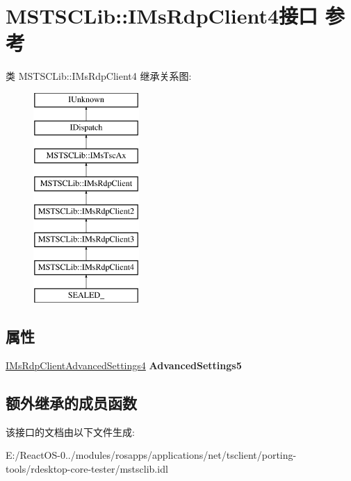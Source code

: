 \hypertarget{interface_m_s_t_s_c_lib_1_1_i_ms_rdp_client4}{}\section{M\+S\+T\+S\+C\+Lib\+:\+:I\+Ms\+Rdp\+Client4接口 参考}
\label{interface_m_s_t_s_c_lib_1_1_i_ms_rdp_client4}
类 M\+S\+T\+S\+C\+Lib\+:\+:I\+Ms\+Rdp\+Client4 继承关系图\+:\begin{figure}[H]
\begin{center}
\leavevmode
\includegraphics[height=8.000000cm]{interface_m_s_t_s_c_lib_1_1_i_ms_rdp_client4}
\end{center}
\end{figure}
\subsection*{属性}
\begin{DoxyCompactItemize}
\item 
\mbox{\label{interface_m_s_t_s_c_lib_1_1_i_ms_rdp_client4_aa27c479dfb03842eb4e7bde7935bed6f}} 
\hyperlink{interface_m_s_t_s_c_lib_1_1_i_ms_rdp_client_advanced_settings4}{I\+Ms\+Rdp\+Client\+Advanced\+Settings4} {\bfseries Advanced\+Settings5}
\end{DoxyCompactItemize}
\subsection*{额外继承的成员函数}


该接口的文档由以下文件生成\+:\begin{DoxyCompactItemize}
\item 
E\+:/\+React\+O\+S-\/0../modules/rosapps/applications/net/tsclient/porting-\/tools/rdesktop-\/core-\/tester/mstsclib.\+idl\end{DoxyCompactItemize}
